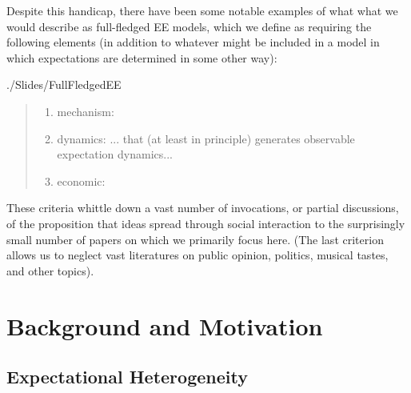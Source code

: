 Despite this handicap, there have been some notable examples of what what we would describe as full-fledged EE models, which we define as requiring the following elements (in addition to whatever might be included in a model in which expectations are determined in some other way):
\begin{verbatimwrite}{./Slides/FullFledgedEE}
\begin{quote}\normalfont
\begin{enumerate}
\item mechanism: 
\item dynamics: 
{... that (at least in principle) generates observable expectation dynamics...}
\item economic: 
  \end{enumerate}
\end{quote}
\end{verbatimwrite}

  These criteria whittle down a vast number of invocations, or partial discussions, of the proposition that ideas spread through social interaction to the surprisingly small number of papers on which we primarily focus here.  (The last criterion allows us to neglect vast literatures on public opinion, politics, musical tastes, and other topics).

\section{Background and Motivation}\label{motivation-and-context}


\subsection{Expectational Heterogeneity}\label{EpiExpHet}\hypertarget{EpiExpHet}{}

